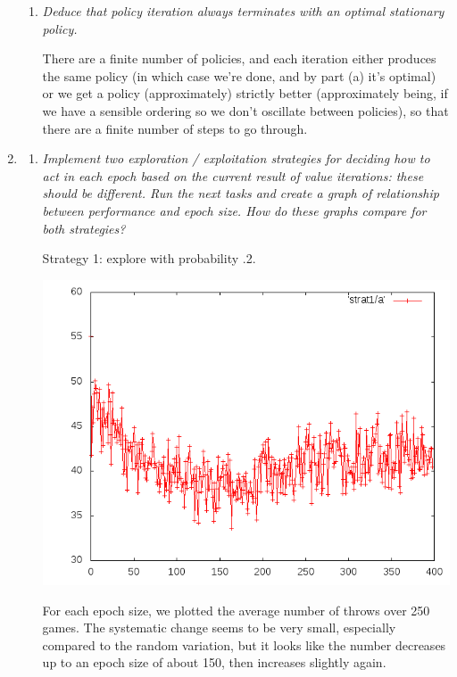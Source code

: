 \documentclass{article}
\begin{document}
\begin{enumerate}
\begin{enumerate}
  \item \emph{Deduce that policy iteration always terminates with an
    optimal stationary policy.}
    
    There are a finite number of policies, and each iteration either
    produces the same policy (in which case we're done, and by part
    (a) it's optimal) or we get a policy (approximately) strictly
    better (approximately being, if we have a sensible ordering so we
    don't oscillate between policies), so that there are a finite
    number of steps to go through.
  \end{enumerate}

\item 
  \begin{enumerate}
  \item \emph{Implement two exploration / exploitation strategies for
    deciding how to act in each epoch based on the current result of
    value iterations: these should be different.  Run the next tasks
    and create a graph of relationship between performance and epoch
    size. How do these graphs compare for both strategies?}

    Strategy 1: explore with probability .2.

    \begin{center}
      \includegraphics[scale=.4]{strat1.png}
    \end{center}

    For each epoch size, we plotted the average number of throws over
    250 games. The systematic change seems to be very small,
    especially compared to the random variation, but it looks like the
    number decreases up to an epoch size of about 150, then increases
    slightly again.


\end{enumerate}
\end{enumerate}
\end{document}
